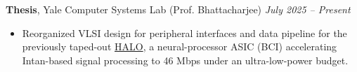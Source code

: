 \documentclass{article}
\begin{document}
\noindent\textbf{Thesis}, Yale Computer Systems Lab (Prof. Bhattacharjee) \hfill \textit{July 2025 – Present} 
\begin{itemize}[noitemsep, topsep=1pt]
    \item{} Reorganized VLSI design for peripheral interfaces and data pipeline for the previously taped-out \href{https://www.cs.yale.edu/homes/abhishek/ksriram-isca20.pdf}{HALO}, a neural-processor ASIC (BCI) accelerating Intan-based signal processing to 46 Mbps under an ultra-low-power budget.
\end{itemize} \vspace{0.7ex}

\end{document}
